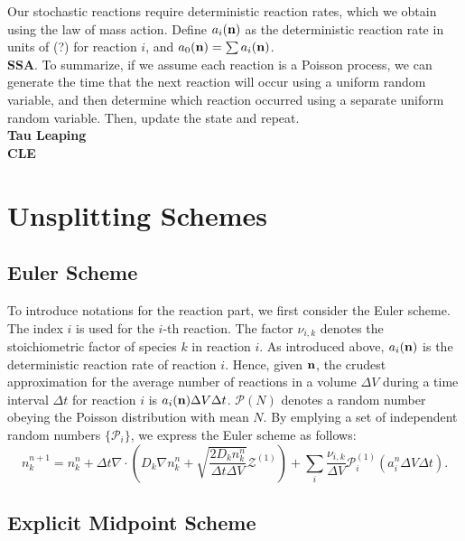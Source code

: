 \documentclass[final]{siamltex}
\def\nb  {{\bf n}}
\def\mZb {\bm{\mathcal{Z}}}
\def\mPb {\bm{\mathcal{P}}}
\begin{document}
Our stochastic reactions require deterministic reaction rates, which we obtain
using the law of mass action.  Define $a_i(\nb)$ as the deterministic reaction
rate in units of (?) for reaction $i$, and $a_0(\nb) = \sum a_i(\nb)$.\\

{\bf SSA}.  To summarize, if we assume each reaction is a Poisson process, we
can generate the time that the next reaction will occur using a uniform random
variable, and then determine which reaction occurred using a separate 
uniform random variable.  Then, update the state and repeat.\\

{\bf Tau Leaping}\\

{\bf CLE}

\section{Unsplitting Schemes}

\subsection{Euler Scheme}

To introduce notations for the reaction part, we first consider the Euler scheme.
The index $i$ is used for the $i$-th reaction.
The factor $\nu_{i,k}$ denotes the stoichiometric factor of species $k$ in reaction $i$.
As introduced above, $a_i(\nb)$ is the deterministic reaction rate of reaction $i$.
Hence, given $\nb$, the crudest approximation for the average number of reactions 
in a volume $\Delta V$ during a time interval $\Delta t$ for reaction $i$ is
$a_i(\nb)\Delta V\Delta t$.
$\mPb(N)$ denotes a random number obeying the Poisson distribution with mean $N$.
By emplying a set of independent random numbers $\{\mPb_i\}$, we express the Euler scheme as follows:
\begin{equation}
n_k^{n+1} = n_k^n + \Delta t \nabla\cdot\left(D_k \nabla n_k^n
+ \sqrt{\frac{2 D_k n_k^n}{\Delta t\Delta V}}\mZb^{(1)}\right)
+\sum_i \frac{\nu_{i,k}}{\Delta V}\mPb^{(1)}_i\left(a_i^n\Delta V\Delta t\right).
\end{equation}

\subsection{Explicit Midpoint Scheme}
\end{document}
